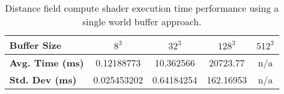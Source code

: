 \begin{table}[h!]
    \centering
    \caption{Distance field compute shader execution time performance using a single world buffer approach.}
    \label{tab:single_buffer_compute}
    \vspace{0.5em}
    \begin{tabular}{l|*{4}{c}}
        \toprule
        \textbf{Buffer Size}    & \textbf{$8^3$} & \textbf{$32^3$} & \textbf{$128^3$} & \textbf{$512^3$} \\
        \midrule
        \textbf{Avg. Time (ms)} & 0.12188773     & 10.362566       & 20723.77         & n/a              \\
        \textbf{Std. Dev (ms)}  & 0.025453202    & 0.64184254      & 162.16953        & n/a              \\
        \bottomrule
    \end{tabular}
\end{table}